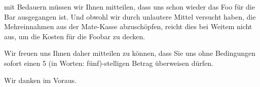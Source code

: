 \documentclass[11pt,ngerman,latin9,a4paper]{g-brief-ntz39lg21}
\begin{document}
\begin{g-brief}

mit Bedauern m\"ussen wir Ihnen mitteilen, dass uns schon wieder das Foo f\"ur die Bar ausgegangen ist. Und obwohl wir durch unlautere Mittel versucht haben, die Mehreinnahmen aus der Mate-Kasse abzusch\"opfen, reicht dies bei Weitem nicht aus, um die Kosten f\"ur die Foobar zu decken.

Wir freuen uns Ihnen daher mitteilen zu k\"onnen, dass Sie uns ohne Bedingungen sofort einen 5 (in Worten: f\"unf)-stelligen Betrag \"uberweisen d\"urfen.

Wir danken im Voraus.

\end{g-brief}
\end{document}
